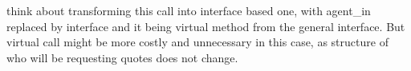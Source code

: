 \begin{DoxyRefList}
\item[\label{_dev_stage2__DevStage2000011}%
\hypertarget{_dev_stage2__DevStage2000011}{}%
Member \hyperlink{classsolar__core_1_1_s_e_i_ad532ca9d30d5988e051b75e33ce6c241}{solar\+\_\+core\+:\+:S\+E\+I\+:\+:form\+\_\+online\+\_\+quote} (std\+::shared\+\_\+ptr$<$ P\+V\+Project $>$ project\+\_\+)]think about transforming this call into interface based one, with agent\+\_\+in replaced by interface and it being virtual method from the general interface. But virtual call might be more costly and unnecessary in this case, as structure of who will be requesting quotes does not change. 
\end{DoxyRefList}